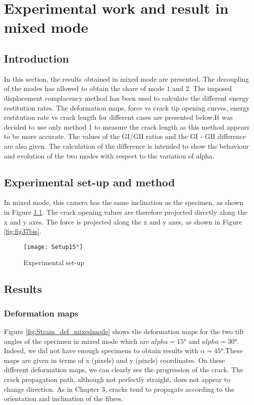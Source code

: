 \chapter{Experimental work and result in mixed mode}
\label{Chapter2}

\section{Introduction}

In this section, the results obtained in mixed mode are presented. The decoupling of the modes has allowed to obtain the share of mode 1 and 2. The imposed displacement complacency method has been used to calculate the different energy restitution rates. The deformation maps, force vs crack tip opening curves, energy restitution rate vs crack length for different cases are presented below.It was decided to use only method 1 to measure the crack length as this method appears to be more accurate. The values of the GI/GII ratios and the GI - GII difference are also given. The calculation of the difference is intended to show the behaviour and evolution of the two modes with respect to the variation of alpha.

\section{Experimental set-up and method}

In mixed mode, this camera has the same inclination as the specimen, as shown in Figure \ref{fig:Setup15°}. The crack opening values are therefore projected directly along the x and y axes. The force is projected along the x and y axes, as shown in Figure \ref{fig:fig37bis}.

\begin{figure}[htp]
	\centering
	\texttt{[image: Setup15°]}
	\caption{Experimental set-up}
	\label{fig:Setup15°}
\end{figure}

\section{Results}

\subsection{Deformation maps}

Figure \ref{fig:Strain_def_mixedmode} shows the deformation maps for the two tilt angles of the specimen in mixed mode which are $alpha=15°$ and $alpha=30°$. Indeed, we did not have enough specimens to obtain results with $\alpha=45°$.These maps are given in terms of x (pixels) and y (pixels) coordinates. On these different deformation maps, we can clearly see the progression of the crack. The crack propagation path, although not perfectly straight, does not appear to change direction. As in Chapter 3, cracks tend to propagate according to the orientation and inclination of the fibres.

